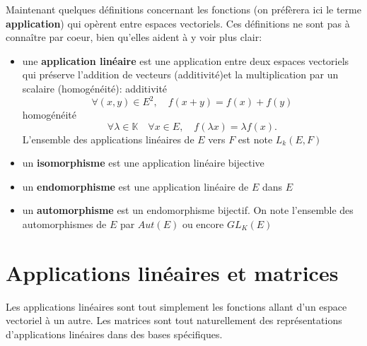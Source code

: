 Maintenant quelques définitions concernant les fonctions (on préfèrera ici le terme {\bf application}) qui opèrent entre espaces vectoriels. Ces définitions ne sont pas à connaître par coeur, bien qu'elles aident à y voir plus clair:
\begin{itemize}
    \item une {\bf application linéaire} est une application entre deux espaces vectoriels qui préserve l'addition de vecteurs (additivité)et la multiplication par un scalaire (homogénéité):
    additivité
    $$
    \forall(x, y) \in E^2, \quad f(x+y)=f(x)+f(y)
    $$
    homogénéité
    $$
    \forall \lambda \in \mathbb{K} \quad \forall x \in E, \quad f(\lambda x)=\lambda f(x) .
    $$
    L'ensemble des applications linéaires de $E$ vers $F$ est note $L_k(E, F)$
    \item un {\bf isomorphisme} est une application linéaire bijective
    \item un {\bf endomorphisme} est une application linéaire de $E$ dans $E$
    \item un {\bf automorphisme} est un endomorphisme bijectif. On note l'ensemble des automorphismes de $E$ par $Aut(E)$ ou encore $GL_K(E)$
\end{itemize}
\section{Applications linéaires et matrices}
Les applications linéaires sont tout simplement les fonctions allant d'un espace vectoriel à un autre. Les matrices sont tout naturellement des représentations d'applications linéaires dans des bases spécifiques.\\


